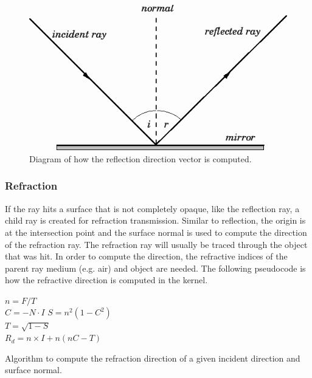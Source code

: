 \documentclass[final]{cmpreport}
\begin{document}
\begin{figure}
    \centering
    \includegraphics[width=\textwidth]{img/reflection_diagram.png}
    \caption{Diagram of how the reflection direction vector is computed. \citep{fitzpatrickreflect}}
\end{figure}

\subsubsection{Refraction}

If the ray hits a surface that is not completely opaque, like the reflection ray, a child ray is created for refraction transmission. Similar to reflection, the origin is at the intersection point and the surface normal is used to compute the direction of the refraction ray. The refraction ray will usually be traced through the object that was hit. In order to compute the direction, the refractive indices of the parent ray medium (e.g. air) and object are needed. The following pseudocode is how the refractive direction is computed in the kernel.

\begin{algorithm} [H]
\SetAlgoLined
{}

$n = F / T$ \\
$C = -N \cdot I$  
$S = n^2(1 - C^2)$ \\
$T = \sqrt{1 - S}$ \\
$R_d = n \times I + n(nC - T)$


\caption{Algorithm to compute the refraction direction of a given incident direction and surface normal.}
\end{algorithm}
\end{document}
